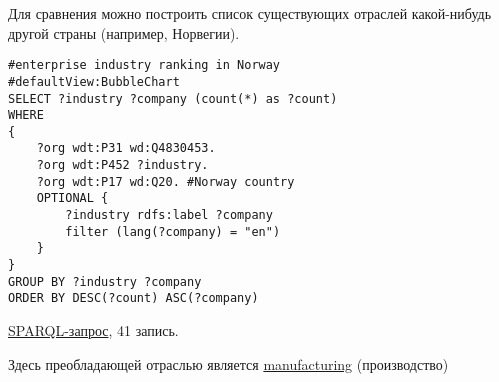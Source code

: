 Для сравнения можно построить список существующих отраслей какой-нибудь другой страны (например, Норвегии).

\begin{lstlisting}[language=SPARQL]
#enterprise industry ranking in Norway
#defaultView:BubbleChart
SELECT ?industry ?company (count(*) as ?count) 
WHERE 
{
    ?org wdt:P31 wd:Q4830453.
    ?org wdt:P452 ?industry.
    ?org wdt:P17 wd:Q20. #Norway country
    OPTIONAL {
		?industry rdfs:label ?company
		filter (lang(?company) = "en")
	}
}
GROUP BY ?industry ?company
ORDER BY DESC(?count) ASC(?company)
\end{lstlisting}

\href{https://query.wikidata.org/#%23enterprise%20industry%20ranking%20in%20Norway%0A%23defaultView%3ABubbleChart%0ASELECT%20%3Findustry%20%3Fcompany%20%28count%28%2a%29%20as%20%3Fcount%29%20%0AWHERE%20%0A%7B%0A%20%20%20%20%3Forg%20wdt%3AP31%20wd%3AQ4830453.%0A%20%20%20%20%3Forg%20wdt%3AP452%20%3Findustry%20.%0A%20%20%20%20%3Forg%20wdt%3AP17%20wd%3AQ20.%20%23Norway%20country%0A%20%20%20%20OPTIONAL%20%7B%0A%09%09%3Findustry%20rdfs%3Alabel%20%3Fcompany%0A%09%09filter%20%28lang%28%3Fcompany%29%20%3D%20%22en%22%29%0A%09%7D%0A%7D%0AGROUP%20BY%20%3Findustry%20%3Fcompany%0AORDER%20BY%20DESC%28%3Fcount%29%20ASC%28%3Fcompany%29%0A}{SPARQL-запрос}, 41 запись.

Здесь преобладающей отраслью является \href{https://www.wikidata.org/wiki/Q187939}{manufacturing} (производство)